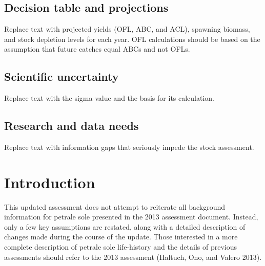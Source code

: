 \documentclass[11pt,
  english,
  letterpaper,
]{article}
\begin{document}
\hypertarget{decision-table-and-projections}{%
\subsection*{Decision table and projections}\label{decision-table-and-projections}}

Replace text with projected yields (OFL, ABC, and ACL), spawning biomass, and stock depletion levels for each year. OFL calculations should be based on the assumption that future catches equal ABCs and not OFLs.

\hypertarget{scientific-uncertainty}{%
\subsection*{Scientific uncertainty}\label{scientific-uncertainty}}

Replace text with the sigma value and the basis for its calculation.

\hypertarget{research-and-data-needs}{%
\subsection*{Research and data needs}\label{research-and-data-needs}}

Replace text with information gaps that seriously impede the stock assessment.

\pagebreak
\setlength{\parskip}{5mm plus1mm minus1mm}
\setcounter{page}{1}
\renewcommand{\thefigure}{\arabic{figure}}
\renewcommand{\thetable}{\arabic{table}}
\setcounter{table}{0}
\setcounter{figure}{0}

\hypertarget{introduction}{%
\section{Introduction}\label{introduction}}

This updated assessment does not attempt to reiterate all background information for petrale sole presented in the 2013 assessment document. Instead, only a few key assumptions are restated, along with a detailed description of changes made during the course of the update. Those interested in a more complete description of petrale sole life-history and the details of previous assessments should refer to the 2013 assessment (Haltuch, Ono, and Valero 2013).
\end{document}
